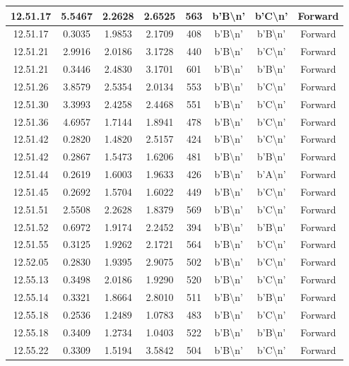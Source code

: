 \begin{table}[H]
\begin{tabular}{|c|c|c|c|c|c|c|c|}
    12.51.17 & 5.5467 & 2.2628 & 2.6525 & 563 & b'B\textbackslash n' & b'C\textbackslash n' & Forward \\ \hline
    12.51.17 & 0.3035 & 1.9853 & 2.1709 & 408 & b'B\textbackslash n' & b'B\textbackslash n' & Forward \\ \hline
    12.51.21 & 2.9916 & 2.0186 & 3.1728 & 440 & b'B\textbackslash n' & b'C\textbackslash n' & Forward \\ \hline
    12.51.21 & 0.3446 & 2.4830 & 3.1701 & 601 & b'B\textbackslash n' & b'B\textbackslash n' & Forward \\ \hline
    12.51.26 & 3.8579 & 2.5354 & 2.0134 & 553 & b'B\textbackslash n' & b'C\textbackslash n' & Forward \\ \hline
    12.51.30 & 3.3993 & 2.4258 & 2.4468 & 551 & b'B\textbackslash n' & b'C\textbackslash n' & Forward \\ \hline
    12.51.36 & 4.6957 & 1.7144 & 1.8941 & 478 & b'B\textbackslash n' & b'C\textbackslash n' & Forward \\ \hline
    12.51.42 & 0.2820 & 1.4820 & 2.5157 & 424 & b'B\textbackslash n' & b'C\textbackslash n' & Forward \\ \hline
    12.51.42 & 0.2867 & 1.5473 & 1.6206 & 481 & b'B\textbackslash n' & b'B\textbackslash n' & Forward \\ \hline
    12.51.44 & 0.2619 & 1.6003 & 1.9633 & 426 & b'B\textbackslash n' & b'A\textbackslash n' & Forward \\ \hline
    12.51.45 & 0.2692 & 1.5704 & 1.6022 & 449 & b'B\textbackslash n' & b'C\textbackslash n' & Forward \\ \hline
    12.51.51 & 2.5508 & 2.2628 & 1.8379 & 569 & b'B\textbackslash n' & b'C\textbackslash n' & Forward \\ \hline
    12.51.52 & 0.6972 & 1.9174 & 2.2452 & 394 & b'B\textbackslash n' & b'B\textbackslash n' & Forward \\ \hline
    12.51.55 & 0.3125 & 1.9262 & 2.1721 & 564 & b'B\textbackslash n' & b'C\textbackslash n' & Forward \\ \hline
    12.52.05 & 0.2830 & 1.9395 & 2.9075 & 502 & b'B\textbackslash n' & b'C\textbackslash n' & Forward \\ \hline
    12.55.13 & 0.3498 & 2.0186 & 1.9290 & 520 & b'B\textbackslash n' & b'C\textbackslash n' & Forward \\ \hline
    12.55.14 & 0.3321 & 1.8664 & 2.8010 & 511 & b'B\textbackslash n' & b'B\textbackslash n' & Forward \\ \hline
    12.55.18 & 0.2536 & 1.2489 & 1.0783 & 483 & b'B\textbackslash n' & b'C\textbackslash n' & Forward \\ \hline
    12.55.18 & 0.3409 & 1.2734 & 1.0403 & 522 & b'B\textbackslash n' & b'B\textbackslash n' & Forward \\ \hline
    12.55.22 & 0.3309 & 1.5194 & 3.5842 & 504 & b'B\textbackslash n' & b'C\textbackslash n' & Forward \\ \hline
    \end{tabular}
\end{table}


